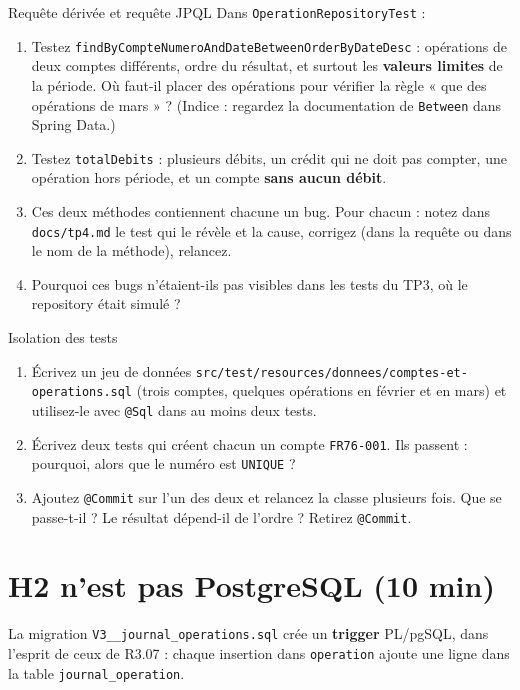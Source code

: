 \documentclass[11pt]{article}
\begin{document}
\begin{exobox}{Requête dérivée et requête JPQL}
Dans \texttt{OperationRepositoryTest} :
\begin{enumerate}[leftmargin=1.4em]
  \item Testez \texttt{findByCompteNumeroAndDateBetweenOrderByDateDesc} : opérations de deux comptes différents, ordre du résultat, et surtout les \textbf{valeurs limites} de la période. Où faut-il placer des opérations pour vérifier la règle « que des opérations de mars » ? (Indice : regardez la documentation de \texttt{Between} dans Spring Data.)
  \item Testez \texttt{totalDebits} : plusieurs débits, un crédit qui ne doit pas compter, une opération hors période, et un compte \textbf{sans aucun débit}.
  \item Ces deux méthodes contiennent chacune un bug. Pour chacun : notez dans \texttt{docs/tp4.md} le test qui le révèle et la cause, corrigez (dans la requête ou dans le nom de la méthode), relancez.
  \item Pourquoi ces bugs n'étaient-ils pas visibles dans les tests du TP3, où le repository était simulé ?
\end{enumerate}
\end{exobox}

\begin{exobox}{Isolation des tests}
\begin{enumerate}[leftmargin=1.4em]
  \item Écrivez un jeu de données \texttt{src/test/resources/donnees/comptes-et-operations.sql} (trois comptes, quelques opérations en février et en mars) et utilisez-le avec \texttt{@Sql} dans au moins deux tests.
  \item Écrivez deux tests qui créent chacun un compte \texttt{FR76-001}. Ils passent : pourquoi, alors que le numéro est \texttt{UNIQUE} ?
  \item Ajoutez \texttt{@Commit} sur l'un des deux et relancez la classe plusieurs fois. Que se passe-t-il ? Le résultat dépend-il de l'ordre ? Retirez \texttt{@Commit}.
\end{enumerate}
\end{exobox}

\section{H2 n'est pas PostgreSQL (10 min)}

La migration \texttt{V3\_\_journal\_operations.sql} crée un \textbf{trigger} PL/pgSQL, dans l'esprit de ceux de R3.07 : chaque insertion dans \texttt{operation} ajoute une ligne dans la table \texttt{journal\_operation}.
\end{document}
